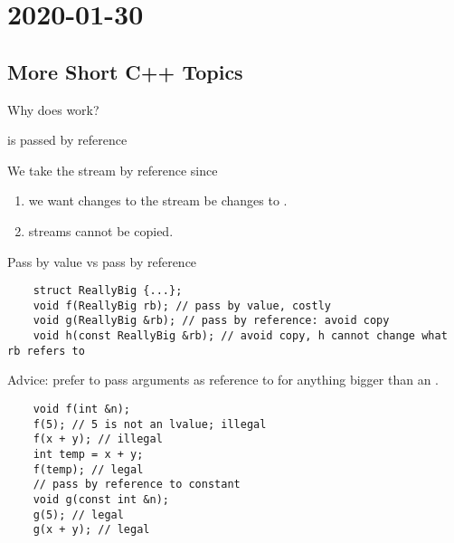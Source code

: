 \section{2020-01-30}
\subsection{More Short C++ Topics}
Why does  work?

 \textrightarrow{}  is passed by reference


We take the stream by reference since
\begin{enumerate}
    \item we want changes to the stream be changes to .
    \item streams cannot be copied.
\end{enumerate}
Pass by value vs pass by reference
\begin{lstlisting}
    struct ReallyBig {...};
    void f(ReallyBig rb); // pass by value, costly
    void g(ReallyBig &rb); // pass by reference: avoid copy
    void h(const ReallyBig &rb); // avoid copy, h cannot change what rb refers to
\end{lstlisting}
Advice: prefer to pass arguments as reference to  for anything bigger
than an .
\begin{lstlisting}
    void f(int &n);
    f(5); // 5 is not an lvalue; illegal
    f(x + y); // illegal
    int temp = x + y;
    f(temp); // legal
    // pass by reference to constant
    void g(const int &n);
    g(5); // legal
    g(x + y); // legal
\end{lstlisting}
